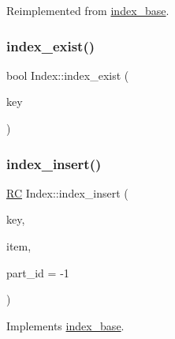 Reimplemented from \hyperlink{classindex__base_ab8bfe46c64ea1ab3c596c46f0b76064e}{index\+\_\+base}.

\mbox{\label{classIndex_a43908d9915fe59437d20a82324bcda61}} 
\subsubsection{\texorpdfstring{index\+\_\+exist()}{index\_exist()}}
{\footnotesize\ttfamily bool Index\+::index\+\_\+exist (\begin{DoxyParamCaption}\item[{\hyperlink{index__base_8h_ae35c40bc2f912c11f0e36ac66cba4489}{K\+E\+Y\+\_\+\+T\+Y\+PE}}]{key }\end{DoxyParamCaption})}

\mbox{\label{classIndex_a03544bdceed7feb756712086fb239de1}} 
\subsubsection{\texorpdfstring{index\+\_\+insert()}{index\_insert()}\hspace{0.1cm}{\footnotesize\ttfamily [1/2]}}
{\footnotesize\ttfamily \hyperlink{global_8h_a78c49a674c810fdd03d20432f7be864a}{RC} Index\+::index\+\_\+insert (\begin{DoxyParamCaption}\item[{\hyperlink{index__base_8h_ae35c40bc2f912c11f0e36ac66cba4489}{K\+E\+Y\+\_\+\+T\+Y\+PE}}]{key,  }\item[{\hyperlink{microbench_2main_8cpp_ae17cb099b4c9aee7835032339b5a9e0d}{V\+A\+L\+U\+E\+\_\+\+T\+Y\+PE}}]{item,  }\item[{int}]{part\+\_\+id = {\ttfamily -\/1} }\end{DoxyParamCaption})\hspace{0.3cm}{\ttfamily [virtual]}}



Implements \hyperlink{classindex__base_a819b2cb7cbc7c740381e64d4c9023745}{index\+\_\+base}.

\mbox{\label{classIndex_a2266050deae0c62e0b90e7d60fd70f35}} 

